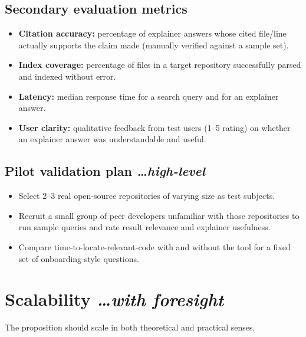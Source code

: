 \documentclass[11pt,a4paper]{article}
\newcommand{\BvrHint}[1]{%
  {\normalfont\normalsize\itshape\hfill #1}}
\begin{document}
\subsection{Secondary evaluation metrics}
\begin{itemize}[leftmargin=0.7cm]
    \item \textbf{Citation accuracy:} percentage of explainer answers whose cited file/line actually supports the claim made (manually verified against a sample set).
    \item \textbf{Index coverage:} percentage of files in a target repository successfully parsed and indexed without error.
    \item \textbf{Latency:} median response time for a search query and for an explainer answer.
    \item \textbf{User clarity:} qualitative feedback from test users (1--5 rating) on whether an explainer answer was understandable and useful.
\end{itemize}

\subsection{Pilot validation plan %
\BvrHint{\ldots high-level}}
\begin{itemize}[leftmargin=0.7cm]
    \item Select 2--3 real open-source repositories of varying size as test subjects.
    \item Recruit a small group of peer developers unfamiliar with those repositories to run sample queries and rate result relevance and explainer usefulness.
    \item Compare time-to-locate-relevant-code with and without the tool for a fixed set of onboarding-style questions.
\end{itemize}

\section{Scalability %
\BvrHint{\ldots with foresight}}
The proposition should scale in both theoretical and practical senses.
\end{document}
